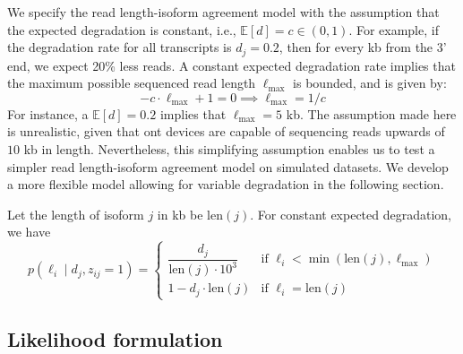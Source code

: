 We specify the read length-isoform agreement model with the assumption that the expected degradation is constant, i.e., $\mathbb{E}[d]=c\in(0,1)$. For example, if the degradation rate for all transcripts is $d_j=0.2$, then for every kb from the 3' end, we expect 20\% less reads. A constant expected degradation rate  implies that the maximum possible sequenced read length $\ell_\mathrm{max}$ is bounded, and is given by:
\begin{equation}
    -c\cdot \ell_\mathrm{max} + 1 = 0 \implies \ell_\mathrm{max} = 1/c
\end{equation}
For instance, a $\mathbb{E}[d]=0.2$ implies that $\ell_\mathrm{max}=5$ kb. The assumption made here is unrealistic, given that \gls{ont} devices are capable of sequencing reads upwards of $10$ kb in length. Nevertheless, this simplifying assumption enables us to test a simpler read length-isoform agreement model on simulated datasets. We develop a more flexible model allowing for variable degradation in the following section.  

Let the length of isoform $j$  in kb be len$(j)$. For constant expected degradation, we have
\begin{equation}
    p(\ell_i\mid d_j, z_{ij}=1) = 
    \begin{cases}
        \dfrac{d_j}{\mathrm{len}(j)\cdot10^3} & \textrm{if } \ell_i<\min(\mathrm{len}(j), \ell_\mathrm{max})\\
        1-d_j\cdot\mathrm{len}(j) & \textrm{if } \ell_i=\mathrm{len}(j)
    \end{cases}
\end{equation}

\subsection{Likelihood formulation}\label{sec:likelihood-formulation}

